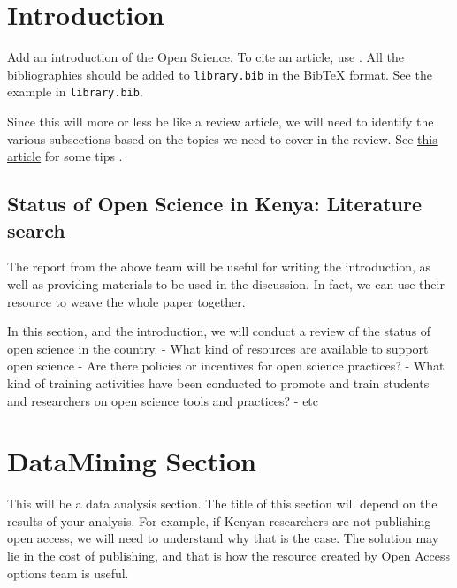 \section*{Introduction}\label{introduction}

Add an introduction of the Open Science. To cite an article, use
\cite{Schlegel2016}. All the bibliographies should be added to
\texttt{library.bib} in the BibTeX format. See the example in
\texttt{library.bib}.

Since this will more or less be like a review article, we will need to
identify the various subsections based on the topics we need to cover in
the review. See
\href{http://journals.plos.org/ploscompbiol/article?id=10.1371/journal.pcbi.1005619}{this
article} for some tips \cite{Mensh2017}.

\subsection*{Status of Open Science in Kenya: Literature
search}\label{status-of-open-science-in-kenya-literature-search}

The report from the above team will be useful for writing the
introduction, as well as providing materials to be used in the
discussion. In fact, we can use their resource to weave the whole paper
together.

In this section, and the introduction, we will conduct a review of the
status of open science in the country. - What kind of resources are
available to support open science - Are there policies or incentives for
open science practices? - What kind of training activities have been
conducted to promote and train students and researchers on open science
tools and practices? - etc

\section*{DataMining Section}\label{datamining-section}

This will be a data analysis section. The title of this section will
depend on the results of your analysis. For example, if Kenyan
researchers are not publishing open access, we will need to understand
why that is the case. The solution may lie in the cost of publishing,
and that is how the resource created by Open Access options team is
useful.

